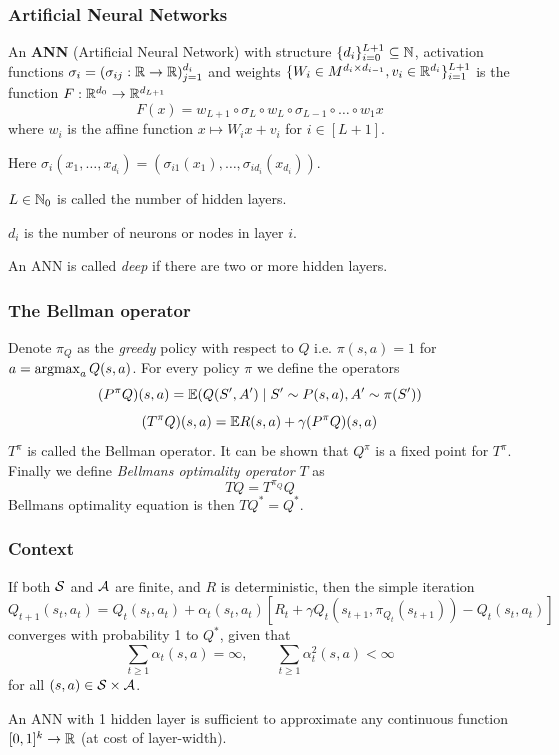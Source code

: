 \documentclass{beamer}
\begin{document}
\begin{frame}
	\frametitle{Artificial Neural Networks}
	\begin{Definition}
	An \textbf{ANN} (Artificial Neural Network) with structure
	$\{ d_i \}_{i=0}^{L+1} \subseteq \mathbb{N}$,
	activation functions $\sigma_i = (\sigma_{ij} : \mathbb{R} \to \mathbb{R})_{j=1}^{d_i}$
	and weights $\{ W_i \in M^{d_i \times d_{i-1}}, v_i \in \mathbb{R}^{d_i} \}_{i=1}^{L+1}$
	is the function $F:\mathbb{R}^{d_0} \to \mathbb{R}^{d_{L+1}}$ 
	\[ F(x) = w_{L+1} \circ \sigma_L \circ w_L \circ \sigma_{L-1} \circ \dots \circ w_1 x \]
		where $w_i$ is the affine function $x \mapsto W_i x + v_i$ for $i \in [L+1]$.

	Here $\sigma_i(x_1, \dots, x_{d_i})
	= (\sigma_{i1}(x_1), \dots, \sigma_{id_{i}}(x_{d_{i}}))$.

	$L \in \mathbb{N}_0$ is called the number of hidden layers.

	$d_i$ is the number of neurons or nodes in layer $i$.
	\end{Definition}

	An ANN is called \emph{deep} if there are two or more hidden layers.
\end{frame}

\begin{frame}
	\frametitle{The Bellman operator}
	Denote $\pi_Q$ as  the \emph{greedy} policy 
	with respect to $Q$ i.e. $\pi(s,a) = 1$ for $a = \operatorname*{argmax}_a Q(s,a)$.
	For every policy $\pi$ we define the operators
	\[ (P^\pi Q)(s, a) = \mathbb{E} (Q(S', A') \mid S' \sim P(s, a), A' \sim \pi(S')) \]
	\[ (T^\pi Q)(s, a) = \mathbb{E} R(s, a) + \gamma (P^\pi Q)(s, a) \]
	$T^\pi$ is called the Bellman operator.
	It can be shown that $Q^{\pi}$ is a fixed point for $T^\pi$.
	Finally we define \emph{Bellmans optimality operator} $T$ as
	\[ T Q = T^{\pi_Q} Q \]
	Bellmans optimality equation is then $T Q^* = Q^*$.
\end{frame}

\begin{frame}
	\frametitle{Context}
	\begin{Theorem}
		If both $\mathcal{S}$ and $\mathcal{A}$ are finite,
		and $R$ is deterministic, then the simple iteration
		\[ Q_{t+1}(s_t, a_t) = Q_t(s_t, a_t) + \alpha_t(s_t, a_t)
			[R_t + \gamma Q_t(s_{t+1}, \pi_{Q_t}(s_{t+1})) - Q_t(s_t, a_t)] \]
		converges with probability 1 to $Q^*$, given that
		\[ \sum_{t\geq 1} \alpha_t(s, a) = \infty, \qquad
			\sum_{t\geq 1} \alpha^2_t(s, a) < \infty \]
		for all $(s, a) \in \mathcal{S} \times \mathcal{A}$.
	\end{Theorem}

	\begin{Theorem}
		An ANN with 1 hidden layer is sufficient to approximate any continuous
		function $[0,1]^k \to \mathbb{R}$ (at cost of layer-width).
	\end{Theorem}
\end{frame}
\end{document}
